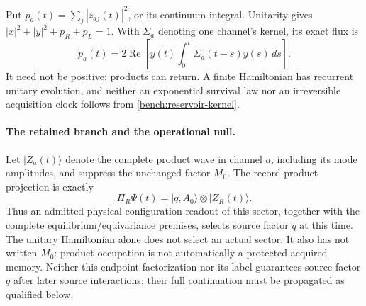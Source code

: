 \documentclass[11pt,oneside,openany]{book}
\theoremstyle{definition}
\theoremstyle{remark}\newtheorem{remark}[theorem]{Remark}
\begin{document}
Put $p_a(t)=\sum_j|z_{aj}(t)|^2$, or its continuum integral. Unitarity
gives $|x|^2+|y|^2+p_R+p_L=1$. With $\Sigma_a$ denoting one channel's
kernel, its exact flux is
\begin{equation}
 \dot p_a(t)=2\operatorname{Re}\left[
  \overline{y(t)}\int_0^t\Sigma_a(t-s)y(s)\,ds\right].
 \label{bench:reservoir-flux}
\end{equation}
It need not be positive: products can return. A finite Hamiltonian has
recurrent unitary evolution, and neither an exponential survival law nor
an irreversible acquisition clock follows from
\eqref{bench:reservoir-kernel}.

\paragraph{The retained branch and the operational null.}
Let $|Z_a(t)\rangle$ denote the complete product wave in channel $a$,
including its mode amplitudes, and suppress the unchanged factor $M_0$.
The record-product projection is exactly
\begin{equation}
 \Pi_R\Psi(t)=|q,A_0\rangle\otimes|Z_R(t)\rangle.
 \label{bench:reservoir-recordbranch}
\end{equation}
Thus an admitted physical configuration readout of this sector, together
with the complete equilibrium/equivariance premises, selects source
factor $q$ at this time. The unitary Hamiltonian alone does not select an
actual sector. It also has not written $M_0$: product occupation is not
automatically a protected acquired memory. Neither this endpoint
factorization nor its label guarantees source factor $q$ after later
source interactions; their full continuation must be propagated as
qualified below.
\end{document}
